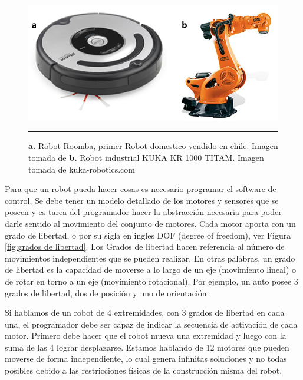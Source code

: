\begin{figure}[htbp]
	\centering
		\includegraphics[width=\textwidth]{./Figures/RobotsInd.png}
		\rule{35em}{0.5pt}
	\caption[Robots Roomba y KUKA]{\textbf{a. }Robot Roomba, primer Robot domestico vendido en chile. Imagen tomada de \cite{Forlizzi:2006:SRD:1121241.1121286} \textbf{b.} Robot industrial KUKA KR 1000 TITAM. Imagen tomada de kuka-robotics.com}
	\label{fig:Roomba y KUKA}
\end{figure}

Para que un robot pueda hacer cosas es necesario programar el software de control. Se debe tener un modelo detallado de los motores y sensores que se poseen y es tarea del programador hacer la abstracción necesaria para poder darle sentido al movimiento del conjunto de motores. Cada motor aporta con un grado de libertad, o por su sigla en ingles DOF (degree of freedom), ver Figura \ref{fig:grados de libertad}. Los Grados de libertad hacen referencia al número de movimientos independientes que se pueden realizar. En otras palabras, un grado de libertad es la capacidad de moverse a lo largo de un eje (movimiento lineal) o de rotar en torno a un eje (movimiento rotacional). Por ejemplo, un auto posee 3 grados de libertad, dos de posición y uno de orientación. 

Si hablamos de un robot de 4 extremidades, con 3 grados de libertad en cada una, el programador debe ser capaz de indicar la secuencia de activación de cada motor. Primero debe hacer que el robot mueva una extremidad y luego con la suma de las 4 lograr desplazarse. Estamos hablando de 12 motores que pueden moverse de forma independiente, lo cual genera infinitas soluciones y no todas posibles debido a las restricciones físicas de la construcción misma del robot.

